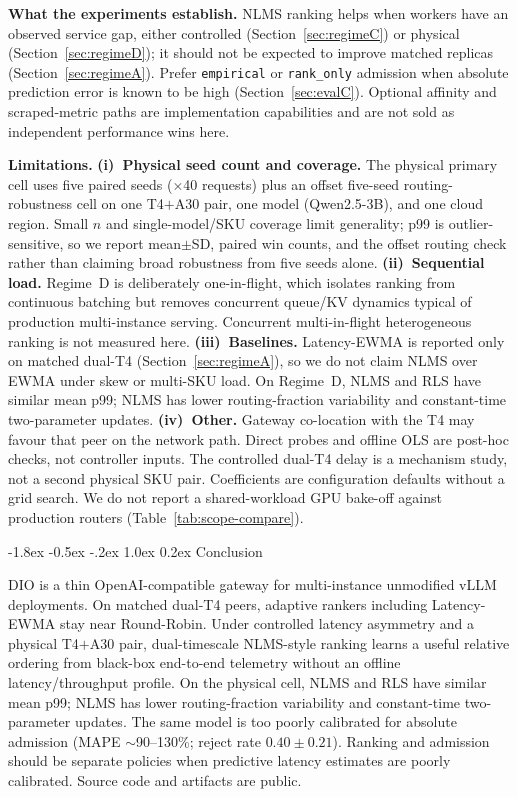 \documentclass[pdflatex,sn-mathphys-num]{sn-jnl}
\makeatletter
\renewcommand{\section}{\@startsection{section}{1}{\z@}%
  {-1.8ex \@plus -0.5ex \@minus -.2ex}%
  {1.0ex \@plus 0.2ex}%
  {\normalfont\large\bfseries}}%
\makeatother
\begin{document}
\textbf{What the experiments establish.}
NLMS ranking helps when workers have an observed service gap, either controlled
(Section~\ref{sec:regimeC}) or physical (Section~\ref{sec:regimeD}); it should not
be expected to improve matched replicas (Section~\ref{sec:regimeA}). Prefer
\texttt{empirical} or \texttt{rank\_only} admission when absolute prediction error
is known to be high (Section~\ref{sec:evalC}). Optional affinity and scraped-metric
paths are implementation capabilities and are not sold as independent performance
wins here.

\textbf{Limitations.}
\textbf{(i)~Physical seed count and coverage.} The physical primary cell uses five
paired seeds ($\times$40 requests) plus an offset five-seed routing-robustness cell
on one T4$+$A30 pair, one model (Qwen2.5-3B), and one cloud region. Small $n$ and
single-model/SKU coverage limit generality; p99 is outlier-sensitive, so we report
mean$\pm$SD, paired win counts, and the offset routing check rather than claiming
broad robustness from five seeds alone.
\textbf{(ii)~Sequential load.} Regime~D is deliberately one-in-flight, which
isolates ranking from continuous batching but removes concurrent queue/KV dynamics
typical of production multi-instance serving. Concurrent multi-in-flight
heterogeneous ranking is not measured here.
\textbf{(iii)~Baselines.} Latency-EWMA is reported only on matched dual-T4
(Section~\ref{sec:regimeA}), so we do not claim NLMS over EWMA under skew or
multi-SKU load. On Regime~D, NLMS and RLS have similar mean p99; NLMS has lower
routing-fraction variability and constant-time two-parameter updates.
\textbf{(iv)~Other.} Gateway co-location with the T4 may favour that peer on the
network path. Direct probes and offline OLS are post-hoc checks, not controller
inputs. The controlled dual-T4 delay is a mechanism study, not a second physical
SKU pair. Coefficients are configuration defaults without a grid search.
We do not report a shared-workload GPU bake-off against production routers
(Table~\ref{tab:scope-compare}).

\section{Conclusion}
\label{sec:conclusion}

DIO is a thin OpenAI-compatible gateway for multi-instance unmodified vLLM
deployments. On matched dual-T4 peers, adaptive rankers including Latency-EWMA stay
near Round-Robin. Under controlled latency asymmetry and a physical T4$+$A30 pair,
dual-timescale NLMS-style ranking learns a useful relative ordering from black-box
end-to-end telemetry without an offline latency/throughput profile. On the physical
cell, NLMS and RLS have similar mean p99; NLMS has lower routing-fraction
variability and constant-time two-parameter updates. The same model is too poorly
calibrated for absolute admission (MAPE $\sim$90--130\%; reject rate
$0.40\pm0.21$). Ranking and admission should be separate policies when predictive
latency estimates are poorly calibrated. Source code and artifacts are public.
\end{document}
